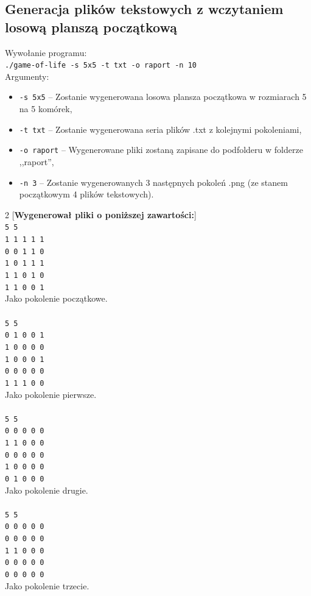 \documentclass{mwart}
\begin{document}
\subsection{Generacja plików tekstowych  z wczytaniem losową planszą początkową}
\noindent{}Wywołanie programu: \\
\texttt{./game-of-life -s 5x5 -t txt -o raport -n 10} \\
Argumenty:
\begin{itemize}
\item \texttt{-s 5x5} -- Zostanie wygenerowana losowa plansza początkowa w rozmiarach 5 na 5 komórek,
\item \texttt{-t txt} -- Zostanie wygenerowana seria plików .txt z kolejnymi pokoleniami,
\item \texttt{-o raport} -- Wygenerowane pliki zostaną zapisane do podfolderu w folderze ,,raport'',
\item \texttt{-n 3} -- Zostanie wygenerowanych 3 następnych pokoleń .png (ze stanem początkowym 4 plików tekstowych).
\vspace{5mm}
\end{itemize}
\begin{center}
\begin{multicols}{2}
[\textbf{Wygenerował pliki o poniższej zawartości:}]
\texttt{
\\\hspace{-13mm}5 5\\
1 1 1 1 1\\
0 0 1 1 0\\
1 0 1 1 1\\
1 1 0 1 0\\
1 1 0 0 1\\
}
Jako pokolenie początkowe.\\
\texttt{
\\\hspace{-13mm}5 5\\
0 1 0 0 1\\
1 0 0 0 0\\
1 0 0 0 1\\
0 0 0 0 0\\
1 1 1 0 0\\
}
Jako pokolenie pierwsze.\\
\texttt{
\\\hspace{-13mm}5 5\\
0 0 0 0 0\\
1 1 0 0 0\\
0 0 0 0 0\\
1 0 0 0 0\\
0 1 0 0 0\\
}
Jako pokolenie drugie.\\
\texttt{
\\\hspace{-13mm}5 5\\
0 0 0 0 0\\
0 0 0 0 0\\
1 1 0 0 0\\
0 0 0 0 0\\
0 0 0 0 0\\
}
Jako pokolenie trzecie.\\
\end{multicols}
\end{center}
\end{document}
